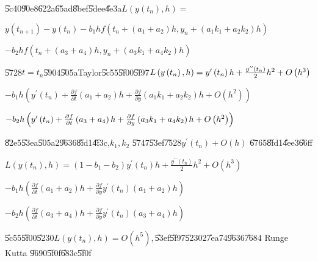 \documentclass{article}
\begin{document}
\U{5c40}\U{90e8}\U{622a}\U{65ad}\U{8bef}\U{5dee}\U{4e3a}$L\left( y\left(
t_{n}\right) ,h\right) =$

$y\left( t_{n+1}\right) -y\left( t_{n}\right) -b_{1}hf\left( t_{n}+\left(
a_{1}+a_{2}\right) h,y_{n}+\left( a_{1}k_{1}+a_{2}k_{2}\right) h\right) $

$-b_{2}hf\left( t_{n}+\left( a_{3}+a_{4}\right) h,y_{n}+\left(
a_{3}k_{1}+a_{4}k_{2}\right) h\right) $

\U{5728}$t=t_{n}$\U{5904}\U{505a}Taylor\U{5c55}\U{5f00}\U{5f97}$L\left(
y\left( t_{n}\right) ,h\right) =y^{\prime }\left( t_{n}\right) h+\frac{%
y^{\prime \prime }\left( t_{n}\right) }{2}h^{2}+O\left( h^{3}\right) $

$-b_{1}h\left( y^{\prime }\left( t_{n}\right) +\frac{\partial f}{\partial t}%
\left( a_{1}+a_{2}\right) h+\frac{\partial f}{\partial y}\left(
a_{1}k_{1}+a_{2}k_{2}\right) h+O\left( h^{2}\right) \right) $

\bigskip $-b_{2}h\left( y^{\prime }\left( t_{n}\right) +\frac{\partial f}{%
\partial t}\left( a_{3}+a_{4}\right) h+\frac{\partial f}{\partial y}\left(
a_{3}k_{1}+a_{4}k_{2}\right) h+O\left( h^{2}\right) \right) $

\bigskip \U{82e5}\U{53ea}\U{505a}2\U{9636}\U{8fd1}\U{4f3c},$k_{1},k_{2}$%
\U{5747}\U{53ef}\U{7528}$y^{\prime }\left( t_{n}\right) +O\left( h\right) $%
\U{6765}\U{8fd1}\U{4ee3}\U{66ff}

$L\left( y\left( t_{n}\right) ,h\right) =\left( 1-b_{1}-b_{2}\right)
y^{\prime }\left( t_{n}\right) h+\frac{y^{\prime \prime }\left( t_{n}\right) 
}{2}h^{2}+O\left( h^{3}\right) $

$-b_{1}h\left( \frac{\partial f}{\partial t}\left( a_{1}+a_{2}\right) h+%
\frac{\partial f}{\partial y}y^{\prime }\left( t_{n}\right) \left(
a_{1}+a_{2}\right) h\right) $

\bigskip $-b_{2}h\left( \frac{\partial f}{\partial t}\left(
a_{3}+a_{4}\right) h+\frac{\partial f}{\partial y}y^{\prime }\left(
t_{n}\right) \left( a_{3}+a_{4}\right) h\right) $

\bigskip \U{5c55}\U{5f00}\U{5230}$L\left( y\left( t_{n}\right) ,h\right)
=O\left( h^{5}\right) ,$\U{53ef}\U{5f97}\U{5230}2\U{7ea7}4\U{9636}\U{7684}%
Runge Kutta \U{9690}\U{5f0f}\U{683c}\U{5f0f}

\end{document}
